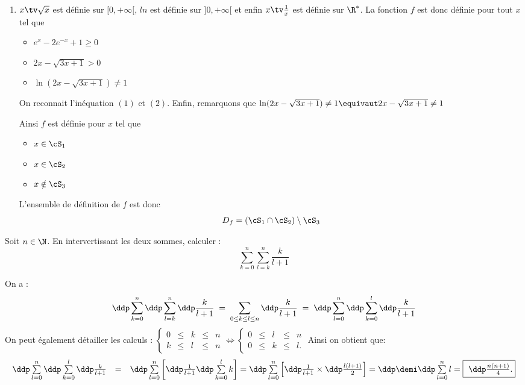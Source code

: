 \documentclass[a4paper, 11pt,reqno]{article}
\begin{document}
\begin{correction}
\begin{enumerate}
\item $x\tv \sqrt{x}$ est définie sur $[0,+\infty[$, $ln$ est définie sur $]0,+\infty[$ et  enfin $x\tv\frac{1}{x} $ est définie sur $\R^*$. La fonction $f$ est donc définie pour tout $x$ tel que 
\begin{itemize}
\item $e^{x}-2e^{-x}+1\geq 0$
\item $2x-\sqrt{3x+1} >0$
\item $\ln(2x-\sqrt{3x+1} ) \neq 1$
\end{itemize}
On reconnait l'inéquation $(1)$ et $(2)$. Enfin, remarquons que 
$\ln(2x-\sqrt{3x+1} ) \neq 1 \equivaut 2x-\sqrt{3x+1} \neq1$  

Ainsi $f$ est définie pour $x$ tel que 
\begin{itemize}
\item $x\in \cS_1$
\item $x\in \cS_2$ 
\item $x\notin \cS_3$
\end{itemize}

L'ensemble de définition de $f$ est donc 
$$D_f =(\cS_1 \cap \cS_2) \setminus \cS_3$$

\conclusion{ $D_f = ]1,\frac{7}{4}[ \cup ]\frac{7}{4},+\infty[$}

\end{enumerate}
\end{correction}


\begin{exercice}
Soit $n\in \N$. En intervertissant les deux sommes, calculer : 
$$\sum_{k=0}^n \sum_{l=k}^n \frac{k}{l+1}$$
\end{exercice}


\begin{correction}
On a :
$$\ddp \sum\limits_{k=0}^n\ddp \sum\limits_{l=k}^n \ddp\frac{k}{l+1} \; = \; \sum_{0\leq k \leq l \leq n} \ddp\frac{k}{l+1}  \; = \;  \ddp \sum\limits_{l=0}^n\ddp \sum\limits_{k=0}^l \ddp\frac{k}{l+1}$$
On peut \'egalement d\'etailler les calculs : $\left\lbrace \begin{array}{lllll}
0 & \leq & k & \leq & n\\
k & \leq & l & \leq & n
\end{array}\right.
\Longleftrightarrow
\left\lbrace \begin{array}{lllll}
0 & \leq &l & \leq & n\\
0 & \leq & k & \leq & l.
\end{array}\right.
$
Ainsi on obtient que: $$\begin{array}{lll}
\ddp \sum\limits_{l=0}^n\ddp \sum\limits_{k=0}^l \ddp\frac{k}{l+1}&=& \ddp \sum\limits_{l=0}^n\left\lbrack \ddp\frac{1}{l+1}
 \ddp \sum\limits_{k=0}^l k\right\rbrack
=  \ddp \sum\limits_{l=0}^n\left\lbrack   \ddp\frac{1}{l+1}  \times \ddp\frac{l(l+1)}{2} \right\rbrack
=\ddp\demi  \ddp \sum\limits_{l=0}^n l=\fbox{ $\ddp\frac{n(n+1)}{4}$.}
\end{array}$$
\end{correction}
\vspace{1cm}
\end{document}
